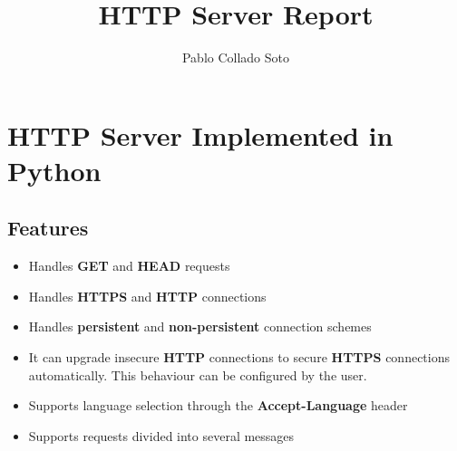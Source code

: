 \documentclass[landscape]{article}
\title{HTTP Server Report}
\author{Pablo Collado Soto}
\date{}
\begin{document}
    \maketitle

    \section{HTTP Server Implemented in Python}
        \subsection{Features}
            \begin{itemize}
                \item Handles \textbf{GET} and \textbf{HEAD} requests
                \item Handles \textbf{HTTPS} and \textbf{HTTP} connections
                \item Handles \textbf{persistent} and \textbf{non-persistent} connection schemes
                \item It can upgrade insecure \textbf{HTTP} connections to secure \textbf{HTTPS} connections automatically. This behaviour can be configured by the user.
                \item Supports language selection through the \textbf{Accept-Language} header
                \item Supports requests divided into several messages
            \end{itemize}
\end{document}
